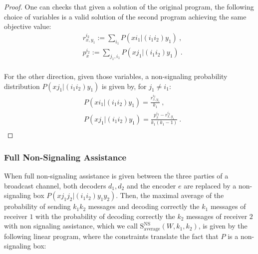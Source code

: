 \documentclass[11pt]{article}
\theoremstyle{definition}
\theoremstyle{remark}
\begin{document}
\begin{proof}
  One can checks that given a solution of the original program, the following choice of variables is a valid solution of the second program achieving the same objective value:
\begin{equation}
  \begin{aligned}
    &r^{i_2}_{x,y_1} := \sum_{i_1} P(xi_1|(i_1i_2)y_1)\ ,\\
    &p^{i_2}_x := \sum_{j_1,i_1} P(xj_1|(i_1i_2)y_1) \ .\\
  \end{aligned}
\end{equation}

For the other direction, given those variables, a non-signaling probability distribution $P(xj_1|(i_1i_2)y_1)$ is given by, for $j_1 \not= i_1$:
\begin{equation}
  \begin{aligned}
    &P(xi_1|(i_1i_2)y_1) = \frac{r^{i_2}_{x,y_1}}{k_1}  \ ,\\
    &P(xj_1|(i_1i_2)y_1) = \frac{p^{i_2}_x - r^{i_2}_{x,y_1}}{k_1(k_1-1)}  \ .\\
  \end{aligned}
\end{equation}
\end{proof}

\subsubsection{Full Non-Signaling Assistance}
When full non-signaling assistance is given between the three parties of a broadcast channel, both decoders $d_1,d_2$ and the encoder $e$ are replaced by a non-signaling box $P(xj_1j_2|(i_1i_2)y_1y_2)$. Then, the maximal average of the probability of sending $k_1k_2$ messages and decoding correctly the $k_1$ messages of receiver $1$ with the probability of decoding correctly the $k_2$ messages of receiver $2$ with non signaling assistance, which we call $\mathrm{S}_{\text{average}}^{\mathrm{NS}}(W,k_1,k_2)$, is given by the following linear program, where the constraints translate the fact that $P$ is a non-signaling box:
\end{document}

